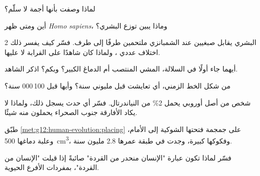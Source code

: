 \begin{exercise}[$\star$]\label{exo:g12:human-evolution:4}
لماذا وصفت  بأنها أجمة لا سلّم؟
\end{exercise}

\begin{exercise}[$\star$]\label{exo:g12:human-evolution:5}
أين ومتى ظهر \emph{Homo sapiens}، وماذا يبين توزع 
البشري؟
\end{exercise}

\begin{exercise}[$\star\star$]\label{exo:g12:human-evolution:6}
 2 البشري يقابل صبغيين عند الشمبانزي ملتحمين طرفًا إلى طرف. فسّر
كيف يفسر ذلك اختلاف عددي ، ولماذا كان شاهدًا على القرابة لا
عليها.
\end{exercise}

\begin{exercise}[$\star\star$]\label{exo:g12:human-evolution:7}
أيهما جاء أولًا في السلالة، المشي المنتصب أم الدماغ الكبير؟ وبكم؟ اذكر
الشاهد.
\end{exercise}

\begin{exercise}[$\star\star$]\label{exo:g12:human-evolution:8}
من شكل الخط الزمني، أي  تعايشت قبل مليوني سنة؟ وأيها قبل
100\,000 سنة؟
\end{exercise}

\begin{exercise}[$\star\star$]\label{exo:g12:human-evolution:9}
شخص من أصل أوروبي يحمل 2\% من  النياندرتال. فسّر أي حدث يسجل ذلك،
ولماذا لا يكاد الأفارقة جنوب الصحراء يحملون منه شيئًا.
\end{exercise}

\begin{exercise}[$\star\star$]\label{exo:g12:human-evolution:10}
طبّق \cref{met:g12:human-evolution:placing} على جمجمة فتحتها الشوكية
إلى الأمام، وعلبة دماغها \qty{500}{cm^3}، وفكوكها كبيرة، وجدت في طبقة
عمرها 2.8 مليون سنة.
\end{exercise}

\begin{exercise}[$\star\star$]\label{exo:g12:human-evolution:11}
فسّر لماذا تكون عبارة "الإنسان منحدر من القردة" صائبةً إذا قيلت
"الإنسان من القردة"، بمفردات الأفرع الحيوية.
\end{exercise}

